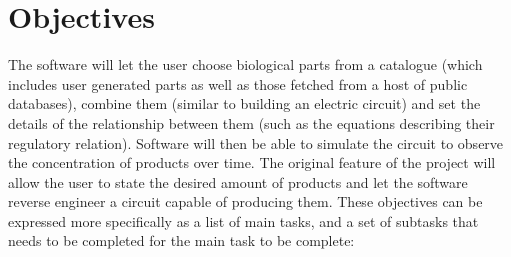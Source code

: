 \documentclass{article}
\begin{document}
	\section{Objectives}
		\par The software will let the user choose biological parts from a catalogue (which includes user generated parts as well as those fetched from a host of public databases), combine them (similar to building an electric circuit) and set the details of the relationship between them (such as the equations describing their regulatory relation). Software will then be able to simulate the circuit to observe the concentration of products over time. The original feature of the project will allow the user to state the desired amount of products and let the software reverse engineer a circuit capable of producing them. These objectives can be expressed more specifically as a list of main tasks, and a set of subtasks that needs to be completed for the main task to be complete:
		
\end{document}
